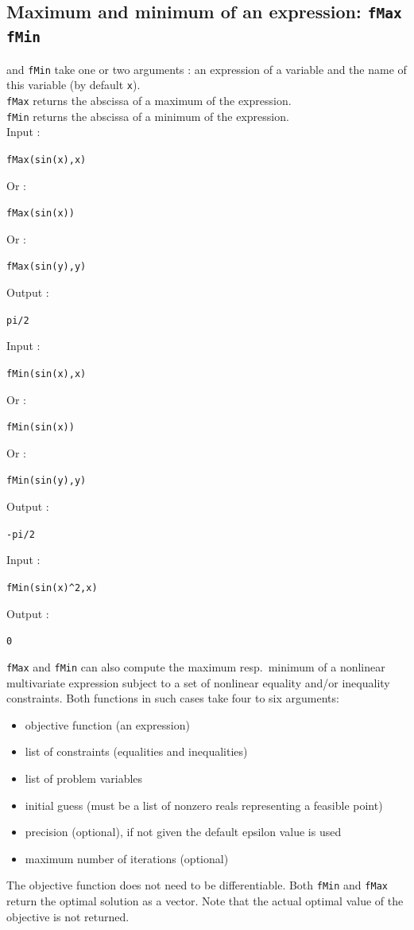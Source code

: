 \documentclass[a4paper,11pt]{book}
\begin{document}
\subsection{Maximum and minimum of an expression: {\tt fMax fMin}} 
 and {\tt fMin} take one or two arguments : an expression 
of a variable and the name of this variable (by default {\tt x}).\\
{\tt fMax} returns the abscissa 
of a maximum of the expression.\\
{\tt fMin} returns the abscissa 
of a minimum of the expression.\\
Input :
\begin{center}{\tt fMax(sin(x),x)}\end{center}
Or :
\begin{center}{\tt fMax(sin(x))}\end{center}
Or :
\begin{center}{\tt fMax(sin(y),y)}\end{center}
Output :
\begin{center}{\tt pi/2}\end{center} 
Input :
\begin{center}{\tt fMin(sin(x),x)}\end{center}
Or :
\begin{center}{\tt fMin(sin(x))}\end{center}
Or :
\begin{center}{\tt fMin(sin(y),y)}\end{center}
Output :
\begin{center}{\tt -pi/2}\end{center} 
Input :
\begin{center}{\tt fMin(sin(x)\verb|^|2,x)}\end{center}
Output :
\begin{center}{\tt 0}\end{center}

{\tt fMax} and {\tt fMin} can also compute the maximum resp.~minimum of a nonlinear multivariate expression subject to a set of nonlinear equality and/or inequality constraints. Both functions in such cases take four to six arguments:
\begin{itemize}
	\item objective function (an expression)
	\item list of constraints (equalities and inequalities)
	\item list of problem variables
	\item initial guess (must be a list of nonzero reals representing a feasible point)
	\item precision (optional), if not given the default epsilon value is used
	\item maximum number of iterations (optional)
\end{itemize}
The objective function does not need to be differentiable.
Both {\tt fMin} and {\tt fMax} return the optimal solution as a vector. Note that the actual optimal value of the objective is not returned.
\end{document}
